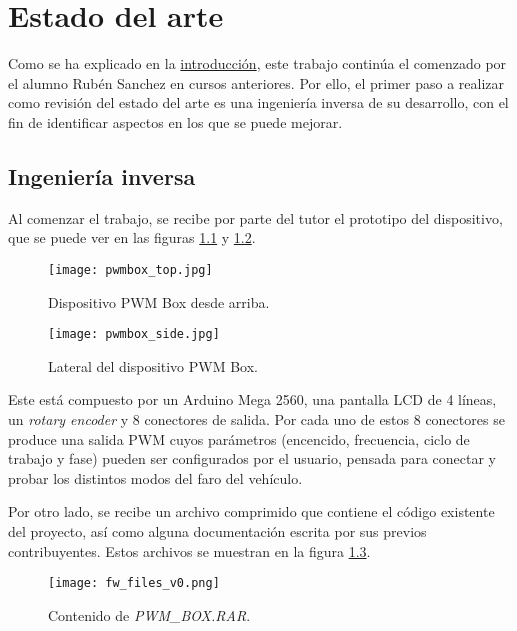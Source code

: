\chapter{Estado del arte}
\label{ch:estado_del_arte}

Como se ha explicado en la \hyperref[ch:introduccion]{introducción}, este trabajo continúa el comenzado por el alumno Rubén Sanchez en cursos anteriores. Por ello, el primer paso a realizar como revisión del estado del arte es una ingeniería inversa de su desarrollo, con el fin de identificar aspectos en los que se puede mejorar.

\section{Ingeniería inversa}
\label{sec:inginv}

Al comenzar el trabajo, se recibe por parte del tutor el prototipo del dispositivo, que se puede ver en las figuras \ref{fig:pwmbox_top} y \ref{fig:pwmbox_side}.

\begin{figure}[h!]
    \centering
    \texttt{[image: pwmbox\_top.jpg]}
    \caption{Dispositivo PWM Box desde arriba.}
    \label{fig:pwmbox_top}
\end{figure}

\begin{figure}[h!]
    \centering
    \texttt{[image: pwmbox\_side.jpg]}
    \caption{Lateral del dispositivo PWM Box.}
    \label{fig:pwmbox_side}
\end{figure}

Este está compuesto por un Arduino Mega 2560, una pantalla LCD de 4 líneas, un \textit{rotary encoder} y 8 conectores de salida. Por cada uno de estos 8 conectores se produce una salida PWM cuyos parámetros (encencido, frecuencia, ciclo de trabajo y fase) pueden ser configurados por el usuario, pensada para conectar y probar los distintos modos del faro del vehículo.

Por otro lado, se recibe un archivo comprimido que contiene el código existente del proyecto, así como alguna documentación escrita por sus previos contribuyentes. Estos archivos se muestran en la figura \ref{fig:fw_v0}.

\begin{figure}[ht]
    \centering
    \texttt{[image: fw\_files\_v0.png]}
    \caption{Contenido de \textit{PWM\_BOX.RAR}.}
    \label{fig:fw_v0}
\end{figure}

